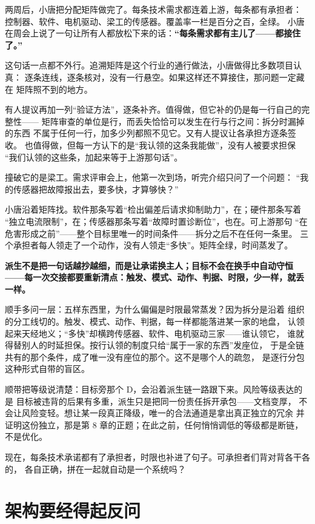 两周后，小唐把分配矩阵做完了。每条技术需求都连着上游，每条都有承担者：
控制器、软件、电机驱动、梁工的传感器。覆盖率一栏是百分之百，全绿。
小唐在周会上说了一句让所有人都放松下来的话：\textbf{“每条需求都有主儿了——都接住了。”}

这句话一点都不外行。追溯矩阵是这个行业的通行做法，小唐做得比多数项目认真：
逐条连线，逐条核对，没有一行悬空。如果这样还不算接住，那问题一定藏在
矩阵照不到的地方。

有人提议再加一列“验证方法”，逐条补齐。值得做，但它补的仍是每一行自己的完整性——
矩阵审查的单位是行，而丢失恰恰可以发生在行与行之间：拆分时漏掉的东西
不属于任何一行，加多少列都照不见它。又有人提议让各承担方逐条签收。
也值得做，但每一方认下的是“我认领的这条我能做”，没有人被要求担保
“我们认领的这些条，加起来等于上游那句话”。

撞破它的是梁工。需求评审会上，他第一次到场，听完介绍只问了一个问题：
“我的传感器把故障报出去，要多快，才算够快？”

小唐沿着矩阵找。软件那条写着“检出偏差后请求抑制助力”，在；硬件那条写着
“独立电流限制”，在；传感器那条写着“故障时置诊断位”，也在。可上游那句
“在危害形成之前”——整个目标里唯一的时间条件——拆分之后不在任何一条里。
三个承担者每人领走了一个动作，没有人领走“多快”。矩阵全绿，时间蒸发了。

\textbf{派生不是把一句话越抄越细，而是让承诺换主人；目标不会在换手中自动守恒——每一次交接都要重新清点：触发、模式、动作、判据、时限，少一样，就丢一样。}

顺手多问一层：五样东西里，为什么偏偏是时限最常蒸发？因为拆分是沿着
组织的分工线切的。触发、模式、动作、判据，每一样都能落进某一家的地盘，
认领起来天经地义；“多快”却横跨传感器、软件、电机驱动三家——谁认领它，
谁就得替别人的时延担保。按行认领的制度只给“属于一家的东西”发座位，
于是全链共有的那个条件，成了唯一没有座位的那个。这不是哪个人的疏忽，
是逐行分包这种形式自带的盲区。

顺带把等级说清楚：目标旁那个 D，会沿着派生链一路跟下来。风险等级表达的是
目标被违背的后果有多重，派生只是把同一份责任拆开承包——文档变厚，
不会让风险变轻。想让某一段真正降级，唯一的合法通道是拿出真正独立的冗余
并证明这份独立，那是第 8 章的正题；在此之前，任何悄悄调低的等级都是断链，
不是优化。

现在，每条技术承诺都有了承担者，时限也补进了句子。可承担者们背对背各干各的，
各自正确，拼在一起就自动是一个系统吗？

\section{架构要经得起反问}

